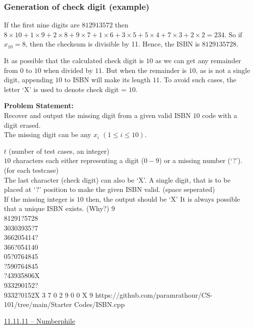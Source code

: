 \documentclass[../../Problems]{subfiles}
\begin{document}
\subsubsection*{Generation of check digit (example)}
If the first nine digits are $812913572$ then $8\times10 + 1\times9 + 2\times8 + 9\times7 + 1\times6 + 3\times5 + 5\times4 + 7\times3 + 2\times2 = 234$. So if $x_{10} = 8$, then the checksum is divisible by 11. Hence, the ISBN is $8129135728$.
\begin{note}
It as possible that the calculated check digit is $10$ as we can get any remainder from $0$ to $10$ when divided by $11$. But when the remainder is $10$, as is not a single digit, appending $10$ to ISBN will make its length $11$. To avoid such cases, the letter `X' is used to denote check digit = $10$.
\end{note}
\textbf{Problem Statement:}\\
Recover and output the missing digit from a given valid ISBN $10$ code with a digit erased.\\
The missing digit can be any $x_i$ $(1\leq i\leq 10)$.
\begin{testcases}
	{$t$ \hfill(number of test cases, an integer)\\
	$10$ characters each either representing a digit ($0-9$) or a missing number (`?').\hfill(for each testcase)\\
	The last character (check digit) can also be `X'.}
	{A single digit, that is to be placed at `?' position to make the given ISBN valid.
 \hfill{(space seperated)}\\
	If the missing integer is $10$ then, the output should be `X'}
	{It is always possible that a unique ISBN exists. (Why?)}
	{9\\81291?5728\\30303935?7\\366205414?\\366?054140\\05?0764845\\?590764845\\?43935806X\\933290152?\\9332?0152X}
	{3 7 0 2 9 0 0 X 9}
	{https://github.com/paramrathour/CS-101/tree/main/Starter Codes/ISBN.cpp}
\end{testcases}
\begin{funvideo}
\href{https://youtu.be/sPFWfAxIiwg}{11.11.11 -- Numberphile}
\end{funvideo}
\end{document}
